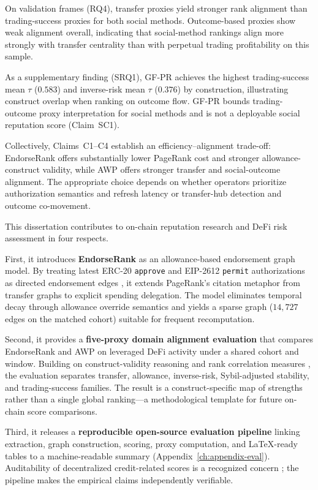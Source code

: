 On validation frames (RQ4), transfer proxies yield stronger rank alignment than trading-success proxies for both social methods. Outcome-based proxies show weak alignment overall, indicating that social-method rankings align more strongly with transfer centrality than with perpetual trading profitability on this sample.

As a supplementary finding (SRQ1), GF-PR achieves the highest trading-success mean $\tau$ ($0.583$) and inverse-risk mean $\tau$ ($0.376$) by construction, illustrating construct overlap when ranking on outcome flow. GF-PR bounds trading-outcome proxy interpretation for social methods and is not a deployable social reputation score (Claim~SC1).

Collectively, Claims~C1--C4 establish an efficiency--alignment trade-off: EndorseRank offers substantially lower PageRank cost and stronger allowance-construct validity, while AWP offers stronger transfer and social-outcome alignment. The appropriate choice depends on whether operators prioritize authorization semantics and refresh latency or transfer-hub detection and outcome co-movement.


This dissertation contributes to on-chain reputation research and DeFi risk assessment in four respects.

First, it introduces \textbf{EndorseRank} as an allowance-based endorsement graph model. By treating latest ERC-20 \texttt{approve} and EIP-2612 \texttt{permit} authorizations as directed endorsement edges , it extends PageRank's citation metaphor  from transfer graphs  to explicit spending delegation. The model eliminates temporal decay through allowance override semantics and yields a sparse graph ($14{,}727$ edges on the matched cohort) suitable for frequent recomputation.

Second, it provides a \textbf{five-proxy domain alignment evaluation} that compares EndorseRank and AWP on leveraged DeFi activity under a shared cohort and window. Building on construct-validity reasoning  and rank correlation measures , the evaluation separates transfer, allowance, inverse-risk, Sybil-adjusted stability, and trading-success families. The result is a construct-specific map of strengths rather than a single global ranking---a methodological template for future on-chain score comparisons.

Third, it releases a \textbf{reproducible open-source evaluation pipeline} linking extraction, graph construction, scoring, proxy computation, and LaTeX-ready tables to a machine-readable summary (Appendix~\ref{ch:appendix-eval}). Auditability of decentralized credit-related scores is a recognized concern ; the pipeline makes the empirical claims independently verifiable.

